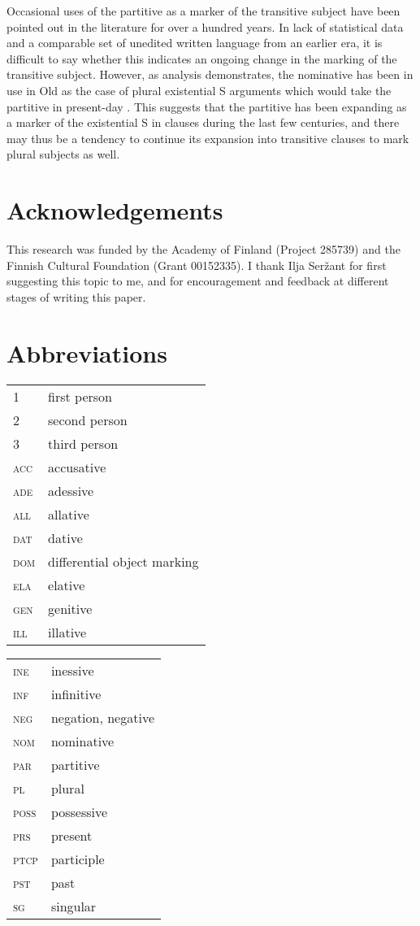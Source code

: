 \documentclass[output=paper]{LSP/langsci}
\begin{document}
Occasional uses of the partitive as a marker of the transitive subject have been pointed out in the literature for over a hundred years. In lack of statistical data and a comparable set of unedited written language from an earlier era, it is difficult to say whether this indicates an ongoing change in the marking of the transitive subject. However, as  analysis demonstrates, the nominative has been in use in Old  as the case of plural existential S arguments which would take the partitive in present-day . This suggests that the partitive has been expanding as a marker of the existential S in  clauses during the last few centuries, and there may thus be a tendency to continue its expansion into transitive clauses to mark plural  subjects as well. 

\section*{Acknowledgements}
This research was funded by the Academy of Finland (Project 285739) and the Finnish Cultural Foundation (Grant 00152335). I thank Ilja Seržant for first suggesting this topic to me, and for encouragement and feedback at  different stages of writing this paper. 

\section*{Abbreviations}
\begin{tabularx}{.45\textwidth}{lQ}
\textsc{1} & first person\\
\textsc{2} & second person\\
\textsc{3} & third person\\
\textsc{acc} & accusative\\
\textsc{ade} & adessive\\
\textsc{all} & allative\\
\textsc{dat} & dative\\
\textsc{dom} & differential object marking\\
\textsc{ela} & elative\\
\textsc{gen} & genitive\\ 
\textsc{ill} & illative\\
\end{tabularx}
\begin{tabularx}{.45\textwidth}{lQ}
\textsc{ine} & inessive\\
\textsc{inf} & infinitive\\
\textsc{neg} & negation, negative\\
\textsc{nom} & nominative\\
\textsc{par} & partitive \\
\textsc{pl} & plural\\
\textsc{poss} & possessive\\
\textsc{prs} & present\\
\textsc{ptcp} & participle \\
\textsc{pst} & past\\
\textsc{sg} & singular\\
\end{tabularx}

{\sloppy
\printbibliography[heading=subbibliography,notkeyword=this] }
\end{document}
